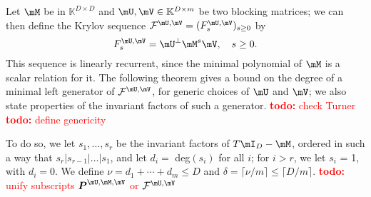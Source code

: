 \documentclass[12pt]{article}
\newcommand{\mat}[1]{\bm{\MakeUppercase{#1}}} %
\newcommand{\seqelt}[1]{F_{#1}} %
\newcommand{\seq}{\mathcal{F}} %
\newcommand{\todo}[1]{\textcolor{red}{{\bf todo:} #1}}
\begin{document}
Let $\mM$ be in $\mathbb{K}^{D \times D}$ and $\mU,\mV \in
\mathbb{K}^{D \times m}$ be two blocking matrices; we can then
define the Krylov sequence $\seq^{\mU,\mV}=(\seqelt{s}^{\mU,\mV})_{s \ge 0}$ 
by
$$F^{\mU,\mV}_s = \mU^{\perp} \mM^s \mV, \quad s \ge 0.$$ This
sequence is linearly recurrent, since the minimal polynomial of $\mM$
is a scalar relation for it. The following theorem gives a bound on
the degree of a minimal left generator of $\seq^{\mU,\mV}$,
for generic choices of $\mU$ and $\mV$; we also
state properties of the invariant factors of such a generator.
\todo{check Turner} \todo{define genericity}

To do so, we let $s_1, \dots, s_r$ be the invariant factors of $T\mI_D
- \mM$, ordered in such a way that $s_r | s_{r-1}| \dots | s_1$, and
let $d_i = $ deg$(s_i)$ for all $i$; for $i > r$, we let $s_i$ = 1,
with $d_i = 0$.  We define $\nu = d_1 + \cdots + d_m \le D$ and
$\delta = \lceil \nu / m \rceil \le \lceil D / m \rceil$.
\todo{unify subscripts  $\mat{P}^{\mU,\mM,\mV}$ or   $\seq^{\mU,\mV}$}

\end{document}
